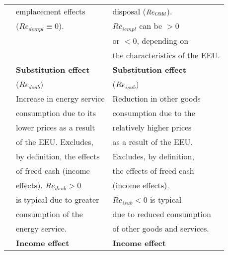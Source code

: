 \begin{table}
\begin{center}
\begin{tabular}{ r l l }
                                   & emplacement effects                          & disposal ($Re_{O\!M\!d}$). \\
                                   &  ($Re_{dempl} \equiv 0$).                    & $Re_{iempl}$ can be $> 0$  \\
                                   &                                              & or $< 0$, depending on \\
                                   &                                              & the characteristics of the EEU. \\
                                   \cmidrule{2-3}
                                   & \textbf{Substitution effect}                 & \textbf{Substitution effect}  \\
                                   & ($Re_{dsub}$)                                & ($Re_{isub}$)  \\
                                   & Increase in energy service                   & Reduction in other goods   \\
                                   & consumption due to its                       & consumption due to the   \\
                                   & lower prices as a result                     & relatively higher prices  \\ 
                                   & of the EEU. Excludes,                        & as a result of the EEU.     \\ 
                                   & by definition, the effects                   & Excludes, by definition,  \\
                                   & of freed cash (income                        & the effects of freed cash    \\
                                   & effects). $Re_{dsub} > 0$                    & (income effects).  \\
                                   & is typical due to greater                    & $Re_{isub} < 0$ is typical  \\
                                   & consumption of the                           & due to reduced consumption \\
                                   & energy service.                              & of other goods and services.\\
                                   \cmidrule{2-3}
                                   & \textbf{Income effect}                       & \textbf{Income effect}  \\

\end{tabular}
\end{center}
\end{table}

